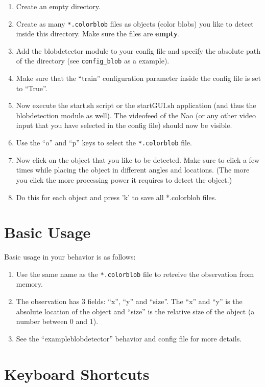 \documentclass[a4paper, 10pt]{article}
\begin{document}
\begin{enumerate}
    \item Create an empty directory.
    \item Create as many \lstinline{*.colorblob} files as objects (color blobs) you like to detect inside this directory. 
        Make sure the files are \textbf{empty}.
    \item Add the blobdetector module to your config file and specify the absolute path of the directory (see \lstinline{config_blob} as a example).
    \item Make sure that the ``train'' configuration parameter inside the config file is set to ``True''.
    \item Now execute the start.sh script or the startGUI.sh application (and thus the blobdetection module as well). 
        The videofeed of the Nao (or any other video input that you have selected in the config file) should now be visible.
    \item Use the ``o'' and ``p'' keys to select the \lstinline{*.colorblob} file.
    \item Now click on the object that you like to be detected. 
        Make sure to click a few times while placing the object in different angles and locations.
        (The more you click the more processing power it requires to detect the object.)
    \item Do this for each object and press 'k' to save all *.colorblob files.
\end{enumerate}

\section{Basic Usage}

Basic usage in your behavior is as follows:
\begin{enumerate}
    \item Use the same name as the \lstinline{*.colorblob} file to retreive the observation from memory.
    \item The observation has 3 fields: ``x'', ``y'' and ``size''. 
        The ``x'' and ``y'' is the absolute location of the object and ``size'' is the relative size of the object (a number between 0 and 1).
    \item See the ``exampleblobdetector'' behavior and config file for more details.
\end{enumerate}

\section{Keyboard Shortcuts}
\end{document}
